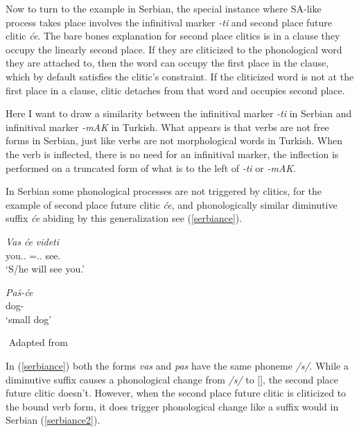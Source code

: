 Now to turn to the example in Serbian, the special instance where SA-like process takes place involves the infinitival marker \textit{-ti} and second place future clitic \textit{\'{c}e}. The bare bones explanation for second place clitics is in a clause they occupy the linearly second place. If they are cliticized to the phonological word they are attached to, then the word can occupy the first place in the clause, which by default satisfies the clitic's constraint. If the cliticized word is not at the first place in a clause, clitic detaches from that word and occupies second place.

Here I want to draw a similarity between the infinitival marker \textit{-ti} in Serbian and infinitival marker \textit{-mAK} in Turkish. What appears is that verbs are not free forms in Serbian, just like verbs are not morphological words in Turkish. When the verb is inflected, there is no need for an infinitival marker, the inflection is performed on a truncated form of what is to the left of \textit{-ti} or \textit{-mAK}.

In Serbian some phonological processes are not triggered by clitics, for the example of second place future clitic \textit{\'{c}e}, and phonologically similar diminutive suffix \textit{\'{c}e} abiding by this generalization see (\ref{serbiance}).

\begin{exe}
    \ex \label{serbiance}
    \begin{xlist}

        \ex \gll
        \textit{Vas} \textit{\'{c}e} \textit{videti} \\ you.{\Pl}.{\Acc} ={\Aux}.{\Third}{\Sg}.{\Fut} see.{\Inf} \\
        \glt `S/he will see you.'
 
        \ex \gll 
        \textit{Pa\u{s}-\'{c}e} \\ dog-{\Dim} \\
        \glt `small dog'

    \end{xlist}
    ${}$ \hfill Adapted from \cite{despic2017suspended}
\end{exe}

In (\ref{serbiance}) both the forms \textit{vas} and \textit{pas} have the same phoneme \textit{/s/}. While a diminutive suffix causes a phonological change from \textit{/s/} to [\textesh], the second place future clitic doesn't. However, when the second place future clitic is cliticized to the bound verb form, it does trigger phonological change like a suffix would in Serbian (\ref{serbiance2}).

